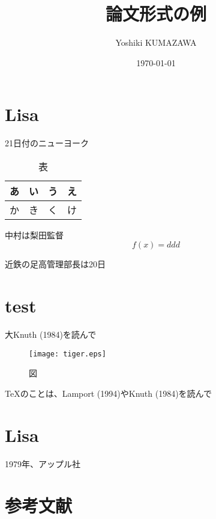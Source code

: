 \documentclass[a4paper,twocolumn]{jsarticle}
\title{論文形式の例}
\author{Yoshiki KUMAZAWA}
\date{\today}
\begin{document}

\balance

\section{Lisa}

21日付のニューヨーク

\begin{table*}
\centering
\begin{tabular}{cc|c|c|c} \hline
\multicolumn{2}{c|}{あ} & い & う & え \\\hline
\multicolumn{2}{c|}{か} & き & く & け \\\hline
\end{tabular}
\caption{表}
\end{table*}


中村は梨田監督
\begin{equation}
f(x)=ddd
\end{equation}

近鉄の足高管理部長は20日

\section{test}


大Knuth (1984)を読んで

\begin{figure*}
\centering
\texttt{[image: tiger.eps]}
\caption{図}
\end{figure*}

\TeX のことは、Lamport (1994)やKnuth (1984)を読んで

\section{Lisa}

1979年、アップル社
\section{参考文献}

\begingroup
\parindent=0pt   %
\end{document}
